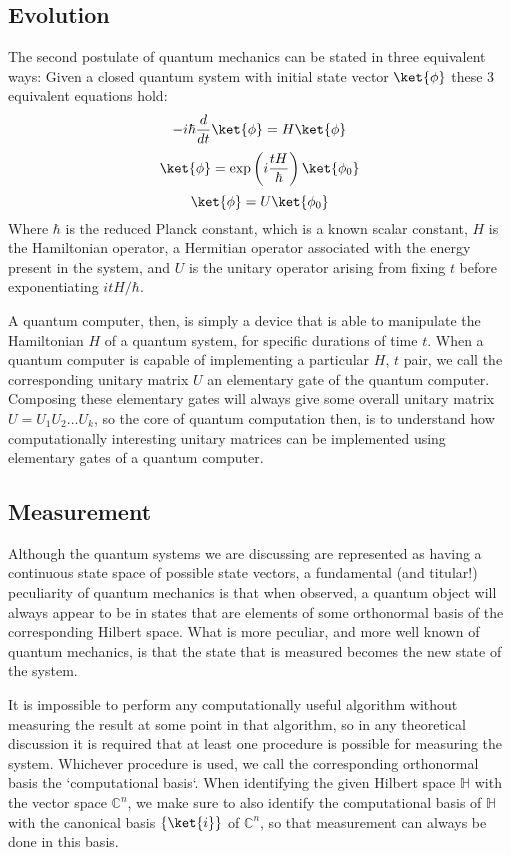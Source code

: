 \subsection{Evolution}
The second postulate of quantum mechanics can be stated in three equivalent ways: Given a closed quantum system with initial state vector $\ket{\phi}$ these 3 equivalent equations hold:
\[-i\hbar\frac{d}{dt}\ket{\phi} = H\ket{\phi}\]
\[\ket{\phi} = \exp\left(i \frac{tH}{\hbar}\right)\ket{\phi_0}\]
\[\ket{\phi} = U\ket{\phi_0}\]
Where $\hbar$ is the reduced Planck constant, which is a known scalar constant, $H$ is the Hamiltonian operator, a Hermitian operator associated with the energy present in the system, and $U$ is the unitary operator arising from fixing $t$ before exponentiating $itH/\hbar$.

A quantum computer, then, is simply a device that is able to manipulate the Hamiltonian $H$ of a quantum system, for specific durations of time $t$. When a quantum computer is capable of implementing a particular $H$, $t$ pair, we call the corresponding unitary matrix $U$ an elementary gate of the quantum computer. Composing these elementary gates will always give some overall unitary matrix $U = U_1U_2\dots U_k$, so the core of quantum computation then, is to understand how computationally interesting unitary matrices can be implemented using elementary gates of a quantum computer.
\subsection{Measurement}
Although the quantum systems we are discussing are represented as having a continuous state space of possible state vectors, a fundamental (and titular!) peculiarity of quantum mechanics is that when observed, a quantum object will always appear to be in states that are elements of some orthonormal basis of the corresponding Hilbert space. What is more peculiar, and more well known of quantum mechanics, is that the state that is measured becomes the new state of the system.

It is impossible to perform any computationally useful algorithm without measuring the result at some point in that algorithm, so in any theoretical discussion it is required that at least one procedure is possible for measuring the system. Whichever procedure is used, we call the corresponding orthonormal basis the `computational basis`. When identifying the given Hilbert space $\mathbb{H}$ with the vector space $\mathbb{C}^n$, we make sure to also identify the computational basis of $\mathbb{H}$ with the canonical basis $\{\ket{i}\}$ of $\mathbb{C}^n$, so that measurement can always be done in this basis.

